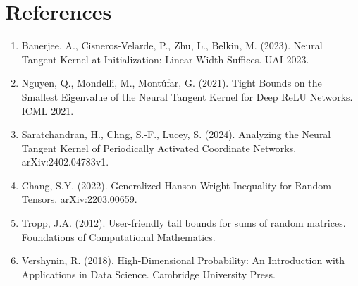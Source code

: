 \documentclass{article}
\begin{document}
\newpage

\section*{References}

\begin{enumerate}
    \item Banerjee, A., Cisneros-Velarde, P., Zhu, L., Belkin, M. (2023). Neural Tangent Kernel at Initialization: Linear Width Suffices. UAI 2023.
    
    \item Nguyen, Q., Mondelli, M., Montúfar, G. (2021). Tight Bounds on the Smallest Eigenvalue of the Neural Tangent Kernel for Deep ReLU Networks. ICML 2021.
    
    \item Saratchandran, H., Chng, S.-F., Lucey, S. (2024). Analyzing the Neural Tangent Kernel of Periodically Activated Coordinate Networks. arXiv:2402.04783v1.
    
    \item Chang, S.Y. (2022). Generalized Hanson-Wright Inequality for Random Tensors. arXiv:2203.00659.
    
    \item Tropp, J.A. (2012). User-friendly tail bounds for sums of random matrices. Foundations of Computational Mathematics.
    
    \item Vershynin, R. (2018). High-Dimensional Probability: An Introduction with Applications in Data Science. Cambridge University Press.
\end{enumerate}
\end{document}
